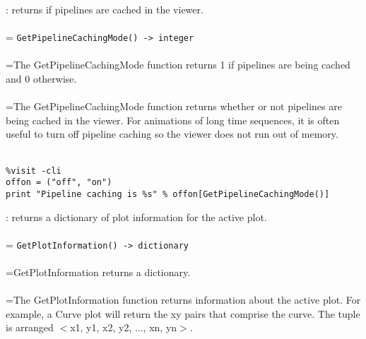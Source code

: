 \documentclass[10pt,a4paper]{report}
\begin{document}
{}
: returns if pipelines are cached in the viewer.\\[-3mm]

 \\ 
\hangindent=\parindent 
\verb!GetPipelineCachingMode() -> integer!\\ [-3mm]

 \\ 
\hangindent=\parindent The GetPipelineCachingMode function returns 1 if pipelines are being cached and 0 otherwise. \\[-3mm] 

 \\ 
\hangindent=\parindent The GetPipelineCachingMode function returns whether or not pipelines are being cached in the viewer. For animations of long time sequences, it is often useful to turn off pipeline caching so the viewer does not run out of memory. \\[-3mm] 

\\[-6mm]
\begin{verbatim}%visit -cli
offon = ("off", "on")
print "Pipeline caching is %s" % offon[GetPipelineCachingMode()]
\end{verbatim}
\newpage


{}
: returns a dictionary of plot information for the active plot.\\[-3mm]

 \\ 
\hangindent=\parindent 
\verb!GetPlotInformation() -> dictionary!\\ [-3mm]

 \\ 
\hangindent=\parindent GetPlotInformation returns a dictionary. \\[-3mm] 

 \\ 
\hangindent=\parindent The GetPlotInformation function returns information about the active plot. For example, a Curve plot will return the xy pairs that comprise the  curve.  The tuple is arranged $<$x1, y1, x2, y2, ..., xn, yn$>$. \\[-3mm] 
\end{document}
